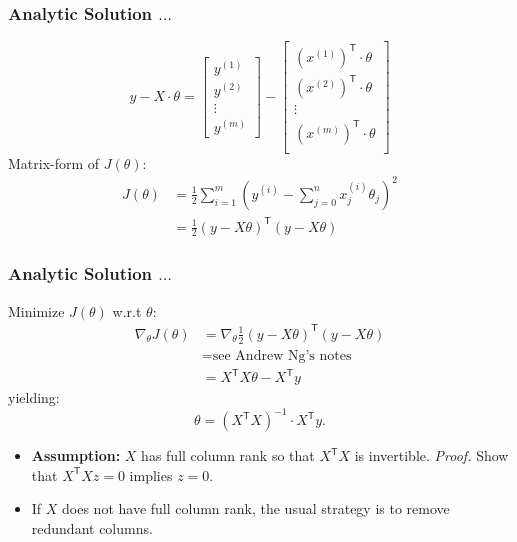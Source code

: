\documentclass[xcolor=table]{beamer}
\newcommand{\trans}[1]{\ensuremath{#1}^{\scriptscriptstyle{\textsf{T}}}}
\begin{document}
\begin{frame}[t]
\frametitle{Analytic Solution $\ldots$}
\[y - X \cdot \theta =  \left [ \begin{array}{c} 
                                    y^{(1)} \\
                                    y^{(2)} \\
                                    \vdots \\
                                    y^{(m)}
                                \end{array}\right ] -
                        \left [ \begin{array}{c}
                                    \trans{(x^{(1)})} \cdot \theta \\
                                    \trans{(x^{(2)})} \cdot \theta \\
                                    \vdots                         \\
                                    \trans{(x^{(m)})} \cdot \theta \\
                                \end{array}
                       \right ]\]
Matrix-form of $J(\theta)$:
\begin{equation*}
\begin{split}
    J(\theta) & = \frac{1}{2} \sum_{i = 1}^{m} \left (y^{(i)} - \sum_{j = 0}^{n} 
                    x^{(i)}_j \theta_j \right )^2 \\
              & = \frac{1}{2} \trans{(y - X \theta)} (y - X \theta)
\end{split}
\end{equation*}
\end{frame}

\begin{frame}[t]
\frametitle{Analytic Solution $\ldots$}
Minimize $J(\theta)$ w.r.t $\theta$:
\begin{equation*}
\begin{split}
    \nabla_{\theta} J(\theta) & = \nabla_{\theta} \frac{1}{2} \trans{(y - X \theta)} (y - X \theta) \\
                              & = \text{see Andrew Ng's notes} \\
                              & = \trans{X} X \theta - \trans{X} y  
\end{split}
\end{equation*}
yielding: 
\[\boxed{\theta = (\trans{X} X)^{-1} \cdot \trans{X}y.}\] 

\pause

\begin{itemize}
    \item \textbf{Assumption:} $X$ has full column rank so that $\trans{X}X$ is invertible. \pause
    \emph{Proof.} Show that $\trans{X} X z = 0$ implies $z = 0$. 

    \pause

    \item If $X$ does not have full column rank, the usual strategy is to remove redundant columns.   
\end{itemize}
\end{frame}
\end{document}
